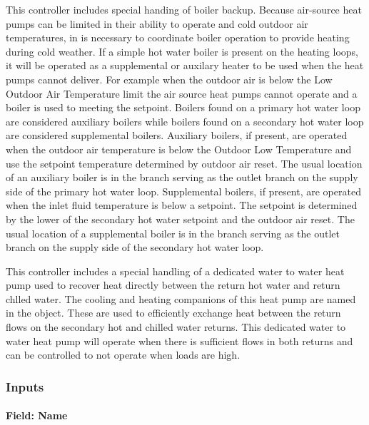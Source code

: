 This controller includes special handing of boiler backup.  Because air-source heat pumps can be limited in their ability to operate and cold outdoor air temperatures, in is necessary to coordinate boiler operation to provide heating during cold weather.  If a simple hot water boiler is present on the heating loops, it will be operated as a supplemental or auxilary heater to be used when the heat pumps cannot deliver.  For example when the outdoor air is below the Low Outdoor Air Temperature limit the air source heat pumps cannot operate and a boiler is used to meeting the setpoint.  Boilers found on a primary hot water loop are considered auxiliary boilers while boilers found on a secondary hot water loop are considered supplemental boilers.  Auxiliary boilers, if present, are operated when the outdoor air temperature is below the Outdoor Low Temperature and use the setpoint temperature determined by outdoor air reset.  The usual location of an auxiliary boiler is in the branch serving as the outlet branch on the supply side of the primary hot water loop.  Supplemental boilers, if present, are operated when the inlet fluid temperature is below a setpoint.  The setpoint is determined by the lower of the secondary hot water setpoint and the outdoor air reset.  The usual location of a supplemental boiler is in the branch serving as the outlet branch on the supply side of the secondary hot water loop.

This controller includes a special handling of a dedicated water to water heat pump used to recover heat directly between the return hot water and return chlled water.  The cooling and heating companions of this heat pump are named in the object.  These are used to efficiently exchange heat between the return flows on the secondary hot and chilled water returns.  This dedicated water to water heat pump will operate when there is sufficient flows in both returns and can be controlled to not operate when loads are high.  

\subsubsection{Inputs}\label{inputs-plantequipmentoperationchillerheaterchangeover}

\paragraph{Field: Name}\label{field-name-plantequipmentoperationchillerheaterchangeover}

